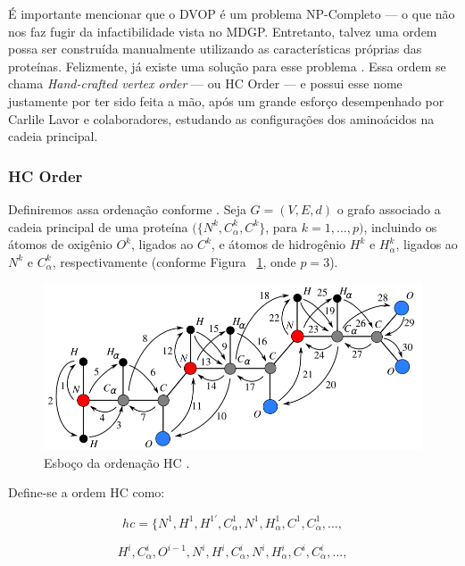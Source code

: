 \documentclass[a4paper,12pt]{article}
\begin{document}
	É importante mencionar que o DVOP é um problema NP-Completo \cite{carlile:dvopComplexity} --- o que não nos faz fugir da infactibilidade vista no MDGP. Entretanto, talvez uma ordem possa ser construída manualmente utilizando as características próprias das proteínas. Felizmente, já existe uma solução para esse problema \cite{carlile:MinimalOrder}. Essa ordem se chama \textit{Hand-crafted vertex order} --- ou HC Order --- e possui esse nome justamente por ter sido feita a mão, após um grande esforço desempenhado por Carlile Lavor e colaboradores, estudando as configurações dos aminoácidos na cadeia principal.
	
	\subsubsection*{HC Order}
	Definiremos assa ordenação conforme \cite{carlile:MinimalOrder}. Seja $G = (V, E, d)$ o grafo associado a cadeia principal de uma proteína $(\{N^k, C^{k}_\alpha,C^k\}$, para $k = 1,\dots,p)$, incluindo os átomos de oxigênio $O^k$, ligados ao $C^k$, e átomos de hidrogênio $H^k$ e $H^{k}_\alpha$, ligados ao $N^k$ e $C^{k}_\alpha$, respectivamente (conforme Figura ~\ref{fig:hcVO}, onde $p = 3$).
	
	\begin{figure}[H]
		\begin{center}
			\includegraphics[width=0.8\linewidth]{hcVO.png}
		\end{center}
		\caption{Esboço da ordenação HC \cite{carlile:MinimalOrder}.}
		\label{fig:hcVO}
	\end{figure}	
	Define-se a ordem HC como:
	
	\begin{minipage}{0.532\linewidth}
		$$
		hc = \{ N^1, H^1, H^{1'}, C_{\alpha}^1, N^1, H_{\alpha}^1, C^1, C_{\alpha}^1, \dots,
		$$
		
	\end{minipage}
	$$
	H^i, C_{\alpha}^i, O^{i-1}, N^i, H^i, C^{i}_\alpha, N^i, H^{i}_\alpha, C^i, C_{\alpha}^i,\dots,
	$$
	
\end{document}

